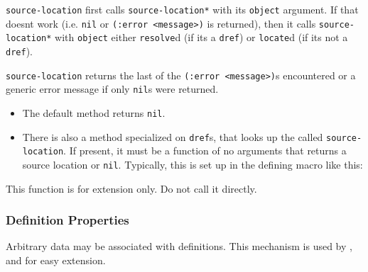 \begin{itemize}
  \texttt{source-location} first calls \texttt{source-location*} with
  its \texttt{object} argument. If that doesn\textquotesingle t work
  (i.e. \texttt{nil} or
  \texttt{(:error\ \textless{}message\textgreater{})} is returned), then
  it calls \texttt{source-location*} with \texttt{object} either
  \texttt{resolve}d (if it\textquotesingle s a \texttt{dref}) or
  \texttt{locate}d (if it\textquotesingle s not a \texttt{dref}).

  \texttt{source-location} returns the last of the
  \texttt{(:error\ \textless{}message\textgreater{})}s encountered or a
  generic error message if only \texttt{nil}s were returned.

  \begin{itemize}
  \item
    The default method returns \texttt{nil}.
  \item
    There is also a method specialized on \texttt{dref}s, that looks up
    the
    called \texttt{source-location}. If present, it must be a function
    of no arguments that returns a source location or \texttt{nil}.
    Typically, this is set up in the defining macro like this:

\begin{Shaded}
\begin{Highlighting}[]
\NormalTok{(}\NormalTok{)}
\end{Highlighting}
\end{Shaded}
  \end{itemize}

  This function is for extension only. Do not call it directly.
\end{itemize}

\subsubsection{Definition Properties}\label{definition-properties}

\label{x-28DREF-EXT-3A-40DEFINITION-PROPERTIES-20MGL-PAX-3ASECTION-29}

Arbitrary data may be associated with definitions. This mechanism is
used by
,
and
for easy extension.

